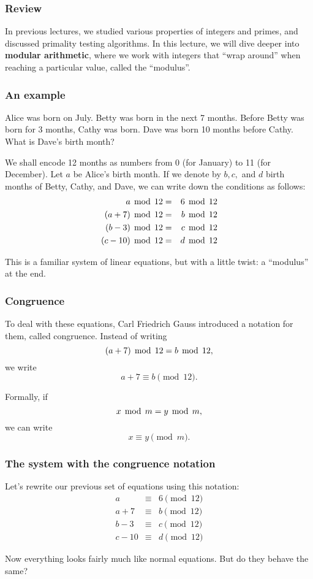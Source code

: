 

\begin{frame}\frametitle{Review}
  In previous lectures, we studied various properties of integers and
  primes, and discussed primality testing algorithms.  In this
  lecture, we will dive deeper into {\bf modular arithmetic}, where we
  work with integers that ``wrap around'' when reaching a particular
  value, called the ``modulus''.
\end{frame}

\begin{frame}\frametitle{An example}
  \begin{tcolorbox}
    Alice was born on July.  Betty was born in the next 7 months.
    Before Betty was born for 3 months, Cathy was born.  Dave was born
    10 months before Cathy.  What is Dave's birth month?
  \end{tcolorbox}

  \pause We shall encode 12 months as numbers from 0 (for January) to
  11 (for December).  Let $a$ be Alice's birth month.  If we denote by
  $b,c,$ and $d$ birth months of Betty, Cathy, and Dave, we can write
  down the conditions as follows:
  \pause
  \begin{eqnarray*}
    a \,\bmod\, 12 &=& 6\,\bmod\, 12\\
    (a + 7) \,\bmod\, 12 &=& b \,\bmod\, 12 \\
    (b - 3) \,\bmod\, 12 &=& c \,\bmod\, 12 \\
    (c - 10) \,\bmod\, 12 &=& d \,\bmod\, 12
  \end{eqnarray*}
  
  \pause This is a familiar system of linear equations, but with a
  little twist: a ``modulus'' at the end.
\end{frame}

\begin{frame}\frametitle{Congruence}
  To deal with these equations, Carl Friedrich Gauss introduced a
  notation for them, called congruence.  Instead of writing
  \[ (a+7)\,\bmod\, 12 = b \,\bmod\, 12,\]
  we write
  \[ a+7 \equiv b \pmod {12}.\]
  \pause

  Formally, if
  \[ x\,\bmod\, m = y\,\bmod\, m, \]
  we can write
  \[ x \equiv y \pmod m.\]
\end{frame}

\begin{frame}\frametitle{The system with the congruence notation}
  Let's rewrite our previous set of equations using this notation:
  \begin{eqnarray*}
    a &\equiv& 6 \pmod {12}\\
    a + 7 &\equiv& b \pmod {12} \\
    b - 3 &\equiv& c \pmod {12} \\
    c - 10 &\equiv& d \pmod {12}
  \end{eqnarray*}

  Now everything looks fairly much like normal equations.  But do they
  behave the same?
\end{frame}
